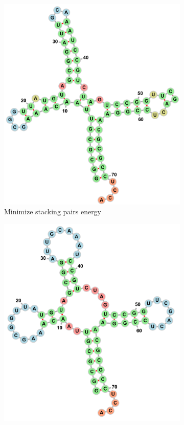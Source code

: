 \documentclass[10pt]{article}
\begin{document}
\begin{figure}[p]
\begin{subfigure}[b]{0.4\linewidth}
        \includegraphics[width=\linewidth]{./img/PDB_00313_minstackenergy.png}
        \caption{Minimize stacking pairs energy}
    \end{subfigure}
    \begin{center}
        \begin{subfigure}[b]{0.5\linewidth}
            \includegraphics[width=\linewidth]{./img/PDB_00313_correct.png}

\end{subfigure}
\end{center}
\end{figure}
\end{document}
